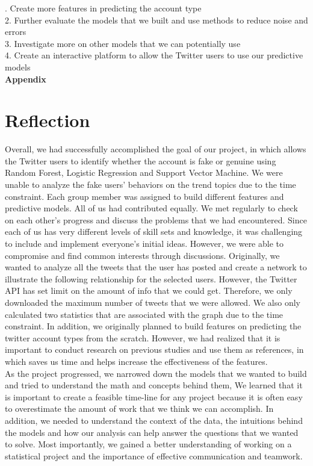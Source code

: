 \documentclass[a4paper, 12pt]{report}
\begin{document}
. Create more features in predicting the account type\\
2. Further evaluate the models that we built and use methods to reduce noise and errors\\
3. Investigate  more on other models that we can potentially use\\
4. Create an interactive platform to allow the Twitter users to use our predictive models\\

\newpage
\large\textbf{Appendix} 
\section*{Reflection}
Overall, we had successfully accomplished the goal of our project, in which allows the Twitter users to identify whether the account is fake or genuine using Random Forest, Logistic Regression and Support Vector Machine. We were unable to analyze the fake users' behaviors on the trend topics due to the time constraint. Each group member was assigned to build different features and predictive models. All of us had contributed equally. We met regularly to check on each other's progress and discuss the problems that we had encountered. Since each of us has very different levels of skill sets and knowledge, it was challenging to include and implement everyone's initial ideas. However, we were able to compromise and find common interests through discussions. Originally, we wanted to analyze all the tweets that the user has posted and create a network to illustrate the following relationship for the selected users. However, the Twitter API has set limit on the amount of info that we could get. Therefore, we only downloaded the maximum number of tweets that we were allowed. We also only calculated two statistics that are associated with the graph due to the time constraint. In addition, we originally planned to build features on predicting the twitter account types from the scratch. However, we had realized that it is important to conduct research on previous studies and use them as references, in which saves us time and helps increase the effectiveness of the features. \\

\noindent As the project progressed, we narrowed down the models that we wanted to build and tried to understand the math and concepts behind them, We learned that it is important to create a feasible time-line for any project because it is often easy to overestimate the amount of work that we think we can accomplish. In addition, we needed to understand the context of the data, the intuitions behind the models and how our analysis can help answer the questions that we wanted to solve. Most importantly, we gained a better understanding of working on a statistical project and the importance of effective communication and teamwork. \\
\end{document}
